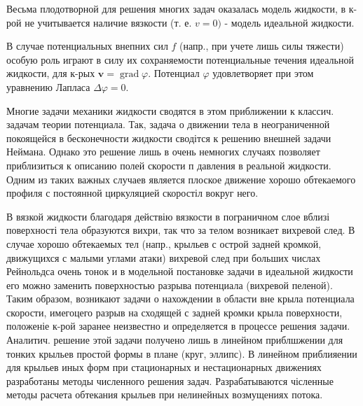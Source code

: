 \documentclass[10pt]{article}
\begin{document}
Весьма плодотворной для решения многих задач оказалась модель жидкости, в к-рой не учитывается наличие вязкости (т. е. $v=0)$ - модель идеальной жидкости.



В случае потенциальных внепних сил $f$ (напр., при учете лишь силы тяжести) особую роль играют в силу их сохраняемости потенциальные течения идеальной жидкости, для к-рых $\boldsymbol{v}=\operatorname{grad} \varphi$. Потенциал $\varphi$ удовлетворяет при этом уравнению Лапласа $\Delta \varphi=0$.



Многие задачи механики жидкости сводятся в этом приближении к классич. задачам теории потенциала. Так, задача о движении тела в неограниченной покоящейся в бесконечности жидкости сводітся к решению внешней задачи Неймана. Однако это решение лишь в очень немногих случаях позволяет приблизиться к описанию полей скорости п давления в реальной жидкости. Одним из таких важных случаев является плоское движение хорошо обтекаемого профиля с постоянной циркуляцией скоростіл вокруг него.



В вязкой жидкости благодаря действію вязкости в пограничном слое вблизі поверхності тела образуются вихри, так что за телом возникает вихревой след. В случае хорошо обтекаемых тел (напр., крыльев с острой задней кромкой, движущихся с малыми углами атаки) вихревой след при больших числах Рейнольдса очень тонок и в модельной постановке задачи в идеальной жидкости его можно заменить поверхностью разрыва потенциала (вихревой пеленой). Таким образом, возникают задачи о нахождении в области вне крыла потенциала скорости, имегоцего разрыв на сходящей с задней кромки крыла поверхности, положеніе к-рой заранее неизвестно и определяется в процессе решения задачи. Аналитич. решение этой задачи получено лишь в линейном приблшжении для тонких крыльев простой формы в плане (круг, эллипс). В линейном приблияении для крыльев иных форм при стационарных и нестационарных движениях разработаны методы численного решения задач. Разрабатываются чісленные методы расчета обтекания крыльев при нелинейных возмущениях потока.
\end{document}
